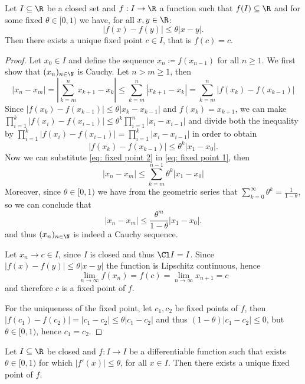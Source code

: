 \begin{theorem}\label{thm: fixed point}
Let \(I \subseteq \R\) be a closed set and \(f: I \to \R\) a
function such that \(f(I) \subseteq \R\) and for some fixed \(\theta
\in [0, 1)\) we have, for all \(x, y \in \R\):
\[
|f(x) - f(y)| \leq \theta |x - y|.
\]
Then there exists a unique fixed point \(c \in I\), that is \(f(c) = c\).
\end{theorem}

\begin{proof}
Let \(x_0 \in I\) and define the sequence \(x_n \coloneq f(x_{n-1})\) for all \(n
\geq 1\). We first show that \((x_n)_{n \in \N}\) is Cauchy. Let \(n >
m \geq 1\), then
\begin{equation}\label{eq: fixed point 1}
|x_n - x_m| = \left| \sum_{k=m}^n x_{k+1} - x_k \right|
\leq \sum_{k=m}^n |x_{k+1} - x_k| = \sum_{k=m}^n |f(x_k) - f(x_{k-1})|
\end{equation}
Since \(|f(x_k) - f(x_{k-1})| \leq \theta |x_k - x_{k-1}|\) and \(f(x_k) =
x_{k+1}\), we can make  \(\prod_{i=1}^k |f(x_i) - f(x_{i-1})| \leq \theta^k
\prod_{i=1}^n |x_i - x_{i-1}|\) and divide both the inequality by
\(\prod_{i=1}^k |f(x_i) - f(x_{i-1})| = \prod_{i=1}^k |x_i - x_{i-1}|\) in
order to obtain
\begin{equation}\label{eq: fixed point 2}
|f(x_k) - f(x_{k-1})| \leq \theta^k |x_1 - x_0|.
\end{equation}
Now we can substitute \cref{eq: fixed point 2} in \cref{eq: fixed point 1},
then
\[
|x_n - x_m| \leq \sum_{k=m}^{n-1} \theta^k |x_1 - x_0|
\]
Moreover, since \(\theta \in [0, 1)\) we have from the geometric series that
\(\sum_{k=0}^\infty \theta^k = \frac{1}{1-\theta}\), so we can conclude that
\[
|x_n - x_m| \leq \frac{\theta^m}{1 - \theta} |x_1 - x_0|.
\]
and thus \((x_n)_{n \in \N}\) is indeed a Cauchy sequence.

Let \(x_n \to c \in I\), since \(I\) is closed and thus \(\Cl I = I\).
Since \(|f(x) - f(y)| \leq \theta |x - y|\) the function is Lipschitz
continuous, hence
\[
\lim_{n \to \infty} f(x_n) = f(c) = \lim_{n \to \infty} x_{n+1} = c
\]
and therefore \(c\) is a fixed point of \(f\).

For the uniqueness of the fixed point, let \(c_1, c_2\) be fixed points of
\(f\), then \(|f(c_1) - f(c_2)| = |c_1 - c_2| \leq \theta |c_1 - c_2|\) and
thus \((1 - \theta)|c_1 - c_2| \leq 0\), but \(\theta \in [0, 1)\), hence
\(c_1 = c_2\).
\end{proof}

\begin{corollary}
Let \(I \subseteq \R\) be closed and \(f : I \to I\) be a
differentiable function such that exists \(\theta \in [0, 1)\) for which
\(|f'(x)| \leq \theta\), for all \(x \in I\). Then there exists a unique fixed
point of \(f\).
\end{corollary}

